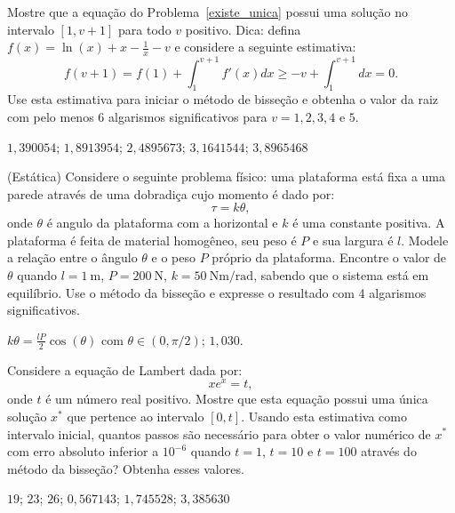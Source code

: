 \begin{exer} Mostre que a equação do Problema~\ref{existe_unica} possui uma solução no intervalo $[1, v+1]$ para todo $v$ positivo. Dica: defina $f(x)=\ln(x)+x-\frac{1}{x}-v$  e considere a seguinte estimativa:
  \begin{equation*}
    f(v+1)=f(1)+\int_1^{v+1}f'(x)dx\geq -v+\int_1^{v+1}dx=0.  
  \end{equation*}
Use esta estimativa para iniciar o método de bisseção e obtenha o valor da raiz com pelo menos 6 algarismos significativos para $v=1, 2, 3, 4$ e $5$.
\end{exer}
\begin{resp}
    $1,390054$; $1,8913954$; $2,4895673$; $3,1641544$; $3,8965468$    
\end{resp}

\begin{exer}(Estática) Considere o seguinte problema físico: uma plataforma está fixa a uma parede através de uma dobradiça cujo momento é dado por:
  \begin{equation*}
    \tau=k\theta,
  \end{equation*}
onde $\theta$ é angulo da plataforma com a horizontal e $k$ é uma constante positiva. A plataforma é feita de material homogêneo, seu peso é $P$ e sua largura é $l$. Modele a relação entre o ângulo $\theta$ e o peso $P$ próprio da plataforma. Encontre o valor de $\theta$ quando $l=1~\mbox{m}$, $P=200~\mbox{N}$, $k=50~\mbox{Nm}/\mbox{rad}$, sabendo que o sistema está em equilíbrio. Use o método da bisseção e expresse o resultado com 4 algarismos significativos.
\end{exer}
\begin{resp}
    $k\theta=\frac{lP}{2}\cos(\theta)$ com $\theta\in (0, \pi/2)$; $1,030$.
\end{resp}


\begin{exer} Considere a equação de Lambert dada por:
  \begin{equation*}
    xe^x= t,
  \end{equation*}
onde $t$ é um número real positivo. Mostre que esta equação possui uma única solução $x^*$ que pertence ao intervalo $[0, t]$. Usando esta estimativa como intervalo inicial, quantos passos são necessário para obter o valor numérico de $x^*$ com erro absoluto inferior a $10^{-6}$ quando $t=1$, $t=10$ e $t=100$ através do método da bisseção? Obtenha esses valores.
\end{exer}
\begin{resp}
    $19$; $23$; $26$; $0,567143$; $1,745528$; $3,385630$
\end{resp}

